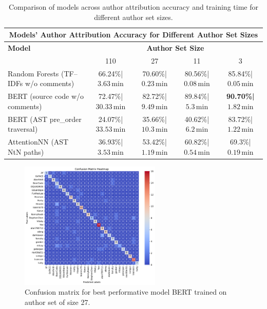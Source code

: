 \documentclass{article}
\begin{document}
\begin{table}[H]
    \centering
    {\scriptsize
    \begin{tabular}{lcccc}
    \hline
    \multicolumn{5}{c}{\textbf{Models' Author Attribution Accuracy for Different Author Set Sizes}} \\
    \hline
    \textbf{Model} & \multicolumn{4}{c}{\textbf{Author Set Size}} \\
    \cline{2-5}
                  & 110  & 27  & 11 & 3 \\ 
    \hline
    Random Forests (TF--IDFs w/o comments) & 66.24\%\;|\;$3.63\,\mathrm{min}$ & 70.60\%\;|\;$0.23\,\mathrm{min}$ & 80.56\%\;|\;$0.08\,\mathrm{min}$ & 85.84\%\;|\;$0.05\,\mathrm{min}$ \\
    BERT (source code w/o comments)        & 72.47\%\;|\;$30.33\,\mathrm{min}$ & 82.72\%\;|\;$9.49\,\mathrm{min}$ & 89.84\%\;|\;$5.3\,\mathrm{min}$  & \textbf{90.70\%\;|\;\boldmath$1.82\,\mathrm{min}$}\\
    BERT (AST pre\_order traversal)        & 24.07\%\;|\;$33.53\,\mathrm{min}$ & 35.66\%\;|\;$10.3\,\mathrm{min}$ & 40.62\%\;|\;$6.2\,\mathrm{min}$  & 83.72\%\;|\;$1.22\,\mathrm{min}$ \\
    AttentionNN (AST NtN paths)            & 36.93\%\;|\;$3.53\,\mathrm{min}$ & 53.42\%\;|\;$1.19\,\mathrm{min}$ & 60.82\%\;|\;$0.54\,\mathrm{min}$  & 69.3\%\;|\;$0.19\,\mathrm{min}$ \\
    \hline
    \end{tabular}
    }
    \caption{Comparison of models across author attribution accuracy and training time for different author set sizes.}
    \label{tab:comparison}
\end{table}

\begin{figure}[H] 
    \centering
    \includegraphics[width=0.6\textwidth]{figures/conf_matrix_sourcode_bert_ts27.pdf}
    \caption{Confusion matrix for best performative model BERT trained on author set of size 27.}
    \label{fig:conf_matrix_bert}
\end{figure}
\end{document}

